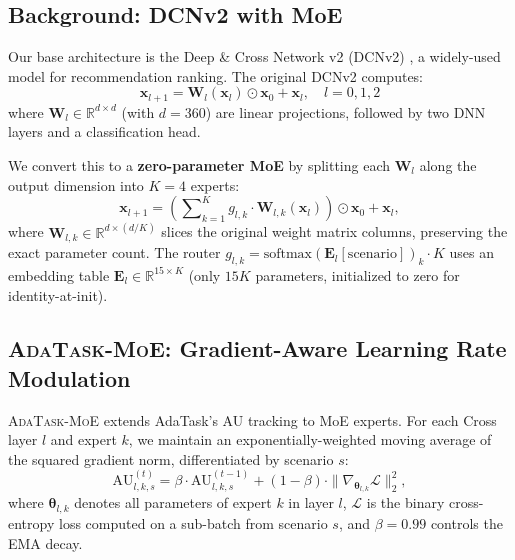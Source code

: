 \documentclass{article}
\begin{document}
\subsection{Background: DCNv2 with MoE}
\label{sec:background}

Our base architecture is the Deep \& Cross Network v2 (DCNv2) \cite{wang2021dcnv2}, a widely-used model for recommendation ranking.
The original DCNv2 computes:
\begin{equation}
    \mathbf{x}_{l+1} = \mathbf{W}_l(\mathbf{x}_l) \odot \mathbf{x}_0 + \mathbf{x}_l, \quad l = 0,1,2
    \label{eq:dcn}
\end{equation}
where $\mathbf{W}_l \in \mathbb{R}^{d \times d}$ (with $d=360$) are linear projections, followed by two DNN layers and a classification head.

We convert this to a \textbf{zero-parameter MoE} by splitting each $\mathbf{W}_l$ along the output dimension into $K=4$ experts:
\begin{equation}
    \mathbf{x}_{l+1} = \left(\sum\nolimits_{k=1}^{K} g_{l,k} \cdot \mathbf{W}_{l,k}(\mathbf{x}_l)\right) \odot \mathbf{x}_0 + \mathbf{x}_l,
    \label{eq:moe_cross}
\end{equation}
where $\mathbf{W}_{l,k} \in \mathbb{R}^{d \times (d/K)}$ slices the original weight matrix columns, preserving the exact parameter count.
The router $g_{l,k} = \text{softmax}(\mathbf{E}_l[\text{scenario}])_k \cdot K$ uses an embedding table $\mathbf{E}_l \in \mathbb{R}^{15 \times K}$ (only $15K$ parameters, initialized to zero for identity-at-init).

\subsection{\textsc{AdaTask-MoE}: Gradient-Aware Learning Rate Modulation}
\label{sec:adatask_moe}

\textsc{AdaTask-MoE} extends AdaTask's AU tracking to MoE experts.
For each Cross layer $l$ and expert $k$, we maintain an exponentially-weighted moving average of the squared gradient norm, differentiated by scenario $s$:
\begin{equation}
    \text{AU}_{l,k,s}^{(t)} = \beta \cdot \text{AU}_{l,k,s}^{(t-1)} + (1 - \beta) \cdot \|\nabla_{\boldsymbol{\theta}_{l,k}} \mathcal{L}\|_2^2,
    \label{eq:au}
\end{equation}
where $\boldsymbol{\theta}_{l,k}$ denotes all parameters of expert $k$ in layer $l$, $\mathcal{L}$ is the binary cross-entropy loss computed on a sub-batch from scenario $s$, and $\beta=0.99$ controls the EMA decay.
\end{document}

